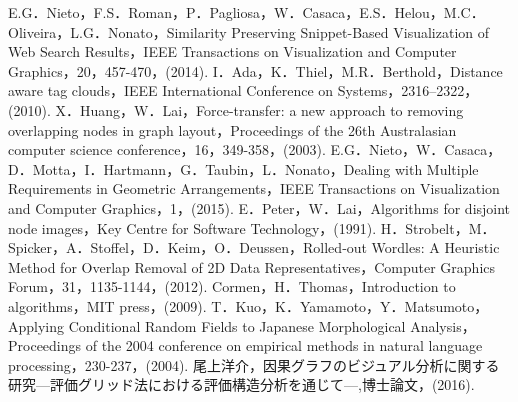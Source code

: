 \documentclass[syuuron]{kuee}
\begin{document}
\begin{thebibliography}{数字}
	 E.G．Nieto，F.S．Roman，P．Pagliosa，W．Casaca，E.S．Helou，M.C．Oliveira，L.G．Nonato，Similarity Preserving Snippet-Based Visualization of Web Search Results，IEEE Transactions on Visualization and Computer Graphics，20，457-470，(2014).
	 I．Ada，K．Thiel，M.R．Berthold，Distance aware tag clouds，IEEE International Conference on Systems，2316–2322，(2010).
	 X．Huang，W．Lai，Force-transfer: a new approach to removing overlapping nodes in graph layout，Proceedings of the 26th Australasian computer science conference，16，349-358，(2003).
	 E.G．Nieto，W．Casaca，D．Motta，I．Hartmann，G．Taubin，L．Nonato，Dealing with Multiple Requirements in Geometric Arrangements，IEEE Transactions on Visualization and Computer Graphics，1，(2015).
	 E．Peter，W．Lai，Algorithms for disjoint node images，Key Centre for Software Technology，(1991).
	 H．Strobelt，M．Spicker，A．Stoffel，D．Keim，O．Deussen，Rolled‐out Wordles: A Heuristic Method for Overlap Removal of 2D Data Representatives，Computer Graphics Forum，31，1135-1144，(2012).
	 Cormen，H．Thomas，Introduction to algorithms，MIT press，(2009).
	 T．Kuo，K．Yamamoto，Y．Matsumoto，Applying Conditional Random Fields to Japanese Morphological Analysis，Proceedings of the 2004 conference on empirical methods in natural language processing，230-237，(2004).
	 尾上洋介，因果グラフのビジュアル分析に関する研究—評価グリッド法における評価構造分析を通じて—,博士論文，(2016).
\end{thebibliography}

\appendix
\end{document}

